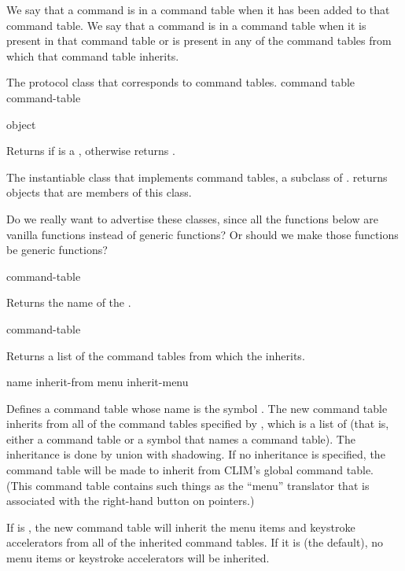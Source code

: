 We say that a command is  in a command table when it has been
added to that command table.  We say that a command is  in a
command table when it is present in that command table or is present in any of
the command tables from which that command table inherits.



The protocol class that corresponds to command tables.
 {command table} {command-table}
\Mutable

 {object}

Returns  if  is a , otherwise returns
.


The instantiable class that implements command tables, a subclass of
.   returns objects that are members of
this class.

 {Do we really want to advertise these classes, since all the
functions below are vanilla functions instead of generic functions?  Or should
we make those functions be generic functions?}


 {command-table}

Returns the name of the  .

 {command-table}

Returns a list of the command tables from which the 
 inherits.
\ReadOnly


 {name \key inherit-from menu inherit-menu}

Defines a command table whose name is the symbol .  The new command
table inherits from all of the command tables specified by ,
which is a list of  (that is, either a command
table or a symbol that names a command table).  The inheritance is done by union
with shadowing.  If no inheritance is specified, the command table will be made
to inherit from CLIM's global command table.  (This command table contains such
things as the ``menu'' translator that is associated with the right-hand button
on pointers.)

If  is , the new command table will inherit the
menu items and keystroke accelerators from all of the inherited command tables.
If it is  (the default), no menu items or keystroke accelerators
will be inherited.

